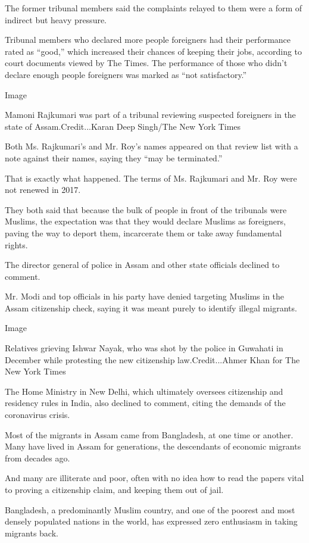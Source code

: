 The former tribunal members said the complaints relayed to them were a
form of indirect but heavy pressure.

Tribunal members who declared more people foreigners had their
performance rated as ``good,'' which increased their chances of keeping
their jobs, according to court documents viewed by The Times. The
performance of those who didn't declare enough people foreigners was
marked as ``not satisfactory.''

Image

Mamoni Rajkumari was part of a tribunal reviewing suspected foreigners
in the state of Assam.Credit...Karan Deep Singh/The New York Times

Both Ms. Rajkumari's and Mr. Roy's names appeared on that review list
with a note against their names, saying they ``may be terminated.''

That is exactly what happened. The terms of Ms. Rajkumari and Mr. Roy
were not renewed in 2017.

They both said that because the bulk of people in front of the tribunals
were Muslims, the expectation was that they would declare Muslims as
foreigners, paving the way to deport them, incarcerate them or take away
fundamental rights.

The director general of police in Assam and other state officials
declined to comment.

Mr. Modi and top officials in his party have denied targeting Muslims in
the Assam citizenship check, saying it was meant purely to identify
illegal migrants.

Image

Relatives grieving Ishwar Nayak, who was shot by the police in Guwahati
in December while protesting the new citizenship law.Credit...Ahmer Khan
for The New York Times

The Home Ministry in New Delhi, which ultimately oversees citizenship
and residency rules in India, also declined to comment, citing the
demands of the coronavirus crisis.

Most of the migrants in Assam came from Bangladesh, at one time or
another. Many have lived in Assam for generations, the descendants of
economic migrants from decades ago.

And many are illiterate and poor, often with no idea how to read the
papers vital to proving a citizenship claim, and keeping them out of
jail.

Bangladesh, a predominantly Muslim country, and one of the poorest and
most densely populated nations in the world, has expressed zero
enthusiasm in taking migrants back.

